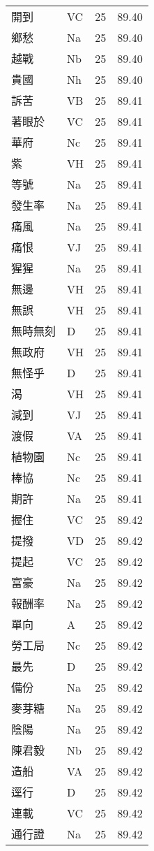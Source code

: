 \documentclass[twocolumn]{book}
\begin{document}
\begin{supertabular}{llrr}
開到 & VC & 25 &  89.40\\
鄉愁 & Na & 25 &  89.40\\
越戰 & Nb & 25 &  89.40\\
貴國 & Nh & 25 &  89.40\\
訴苦 & VB & 25 &  89.41\\
著眼於 & VC & 25 &  89.41\\
華府 & Nc & 25 &  89.41\\
紫 & VH & 25 &  89.41\\
等號 & Na & 25 &  89.41\\
發生率 & Na & 25 &  89.41\\
痛風 & Na & 25 &  89.41\\
痛恨 & VJ & 25 &  89.41\\
猩猩 & Na & 25 &  89.41\\
無邊 & VH & 25 &  89.41\\
無誤 & VH & 25 &  89.41\\
無時無刻 & D & 25 &  89.41\\
無政府 & VH & 25 &  89.41\\
無怪乎 & D & 25 &  89.41\\
渴 & VH & 25 &  89.41\\
減到 & VJ & 25 &  89.41\\
渡假 & VA & 25 &  89.41\\
植物園 & Nc & 25 &  89.41\\
棒協 & Nc & 25 &  89.41\\
期許 & Na & 25 &  89.41\\
握住 & VC & 25 &  89.42\\
提撥 & VD & 25 &  89.42\\
提起 & VC & 25 &  89.42\\
富豪 & Na & 25 &  89.42\\
報酬率 & Na & 25 &  89.42\\
單向 & A & 25 &  89.42\\
勞工局 & Nc & 25 &  89.42\\
最先 & D & 25 &  89.42\\
備份 & Na & 25 &  89.42\\
麥芽糖 & Na & 25 &  89.42\\
陰陽 & Na & 25 &  89.42\\
陳君毅 & Nb & 25 &  89.42\\
造船 & VA & 25 &  89.42\\
逕行 & D & 25 &  89.42\\
連載 & VC & 25 &  89.42\\
通行證 & Na & 25 &  89.42\\

\end{supertabular}
\end{document}
